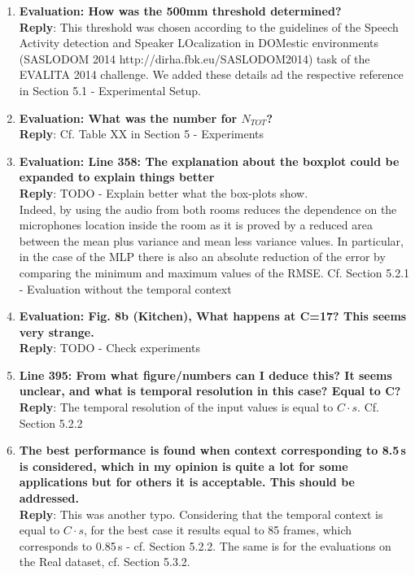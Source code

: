 \documentclass[11pt, technote, letterpaper, oneside, onecolumn]{IEEEtran}
\begin{document}
\begin{enumerate}
\item \textbf{Evaluation: How was the 500mm threshold determined?\\}
\textbf{Reply}: This threshold was chosen according to the guidelines of the Speech Activity detection and Speaker LOcalization in DOMestic environments (SASLODOM 2014 http://dirha.fbk.eu/SASLODOM2014) task of the EVALITA 2014 challenge. We added these details ad the respective reference in Section 5.1 - Experimental Setup.

\item \textbf{Evaluation: What was the number for $N_{TOT}$?\\}
\textbf{Reply}: Cf. Table XX in Section 5 - Experiments

\item \textbf{Evaluation: Line 358: The explanation about the boxplot could be expanded to explain things better\\}
\textbf{Reply}: TODO - Explain better what the box-plots show.\\
Indeed, by using the audio from both rooms reduces the dependence on the microphones location inside the room as it is proved by a reduced area between the mean plus variance and mean less variance values. In particular, in the case of the MLP there is also an absolute reduction of the error by comparing the minimum and maximum values of the RMSE. Cf. Section 5.2.1 - Evaluation without the temporal context

\item \textbf{Evaluation: Fig. 8b (Kitchen), What happens at C=17? This seems very strange.\\}
\textbf{Reply}: TODO - Check experiments

\item \textbf{Line 395: From what figure/numbers can I deduce this? It seems unclear, and what is temporal resolution in this case? Equal to C?\\}
\textbf{Reply}: The temporal resolution of the input values is equal to $C\cdot s$. Cf. Section 5.2.2 

\item \textbf{The best performance is found when context corresponding to 8.5\,s is considered, which in my opinion is quite a lot for some applications but for others it is acceptable. This should be addressed.\\}
\textbf{Reply}:  This was another typo. Considering that the temporal context is equal to $C\cdot s$, for the best case it results equal to 85 frames, which corresponds to 0.85\,s - cf. Section 5.2.2. The same is for the evaluations on the Real dataset, cf. Section 5.3.2.


\end{enumerate}
\end{document}
